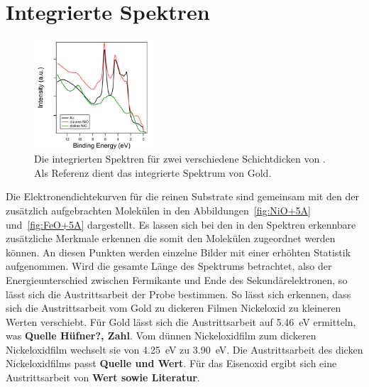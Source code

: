     \section{Integrierte Spektren}
    \label{sec:EDC}
        \begin{figure}
            \centering
            \includegraphics[width=4.5cm]{./content/NiO_Filmdicke}
            \caption{Die integrierten Spektren für zwei verschiedene Schichtdicken von . Als Referenz dient das integrierte Spektrum von Gold.}
            \label{fig:NiO_Filmdicke}
        \end{figure}
        Die Elektronendichtekurven für die reinen Substrate sind gemeinsam mit den der zusätzlich aufgebrachten Molekülen in den Abbildungen~\ref{fig:NiO+5A} und~\ref{fig:FeO+5A} dargestellt.
        Es lassen sich bei den in den Spektren erkennbare zusätzliche Merkmale erkennen die somit den Molekülen zugeordnet werden können.
        An diesen Punkten werden einzelne Bilder mit einer erhöhten Statistik aufgenommen.
        Wird die gesamte Länge des Spektrums betrachtet, also der Energieunterschied zwischen Fermikante und Ende des Sekundärelektronen, so lässt sich die Austrittsarbeit der Probe bestimmen.
        So lässt sich erkennen, dass sich die Austrittsarbeit vom Gold zu dickeren Filmen Nickeloxid zu kleineren Werten verschiebt.
        Für Gold lässt sich die Austrittsarbeit auf \SI{5.46}{\electronvolt} ermitteln, was \textbf{Quelle Hüfner?, Zahl}.
        Vom dünnen Nickeloxidfilm zum dickeren Nickeloxidfilm wechselt sie von \SI{4.25}{\electronvolt} zu \SI{3.90}{\electronvolt}.
        Die Austrittsarbeit des dicken Nickeloxidfilms passt \textbf{Quelle und Wert}.
        Für das Eisenoxid ergibt sich eine Austrittsarbeit von \textbf{Wert sowie Literatur}.


